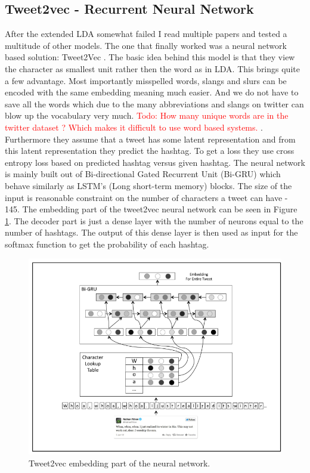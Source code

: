 \documentclass[10pt,conference,compsocconf]{IEEEtran}
\newcommand\todo[1]{\textcolor{red}{Todo: #1}}
\begin{document}
\subsection{Tweet2vec - Recurrent Neural Network}
After the extended LDA somewhat failed I read multiple papers and tested a multitude of other models. The one that finally worked was a neural network based solution: Tweet2Vec \cite{DhingraZFMC16}. The basic idea behind this model is that they view the character as smallest unit rather then the word as in LDA. This brings quite a few advantage. Most importantly misspelled words, slangs and slurs can be encoded with the same embedding meaning much easier. And we do not have to save all the words which due to the many abbreviations and slangs on twitter can blow up the vocabulary very much.  \todo{How many unique words are in the twitter dataset ? Which makes it difficult to use word based systems. }. Furthermore they assume that a tweet has some latent representation and from this latent representation they predict the hashtag. To get a loss they use cross entropy loss based on predicted hashtag versus given hashtag. The neural network is mainly built out of Bi-directional Gated Recurrent Unit (Bi-GRU) which behave similarly as LSTM's (Long short-term memory) blocks. The size of the input is reasonable constraint on the number of characters a tweet can have - 145. The embedding part of the tweet2vec neural network can be seen in Figure \ref{fig:tweet2vecembedding}. The decoder part is just a dense layer with the number of neurons equal to the number of hashtags. The output of this dense layer is then used as input for the softmax function to get the probability of each hashtag. 
\begin{figure}
	\centering
	\includegraphics[width=0.7\linewidth]{images/tweet2vec_embedding}
	\caption{Tweet2vec embedding part of the neural network.}
	\label{fig:tweet2vecembedding}
\end{figure}
\end{document}
